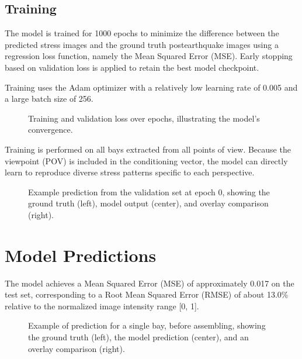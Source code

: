 \documentclass[letterpaper,10pt,english]{sphinxmanual}
\begin{document}
\section{Training}
\label{\detokenize{model:training}}
\sphinxAtStartPar
The model is trained for 1000 epochs to minimize the difference between the
predicted stress images and the ground truth post\sphinxhyphen{}earthquake images using a
regression loss function, namely the Mean Squared Error (MSE).
Early stopping based on validation loss is applied to retain the best model checkpoint.

\sphinxAtStartPar
Training uses the Adam optimizer with a relatively low learning rate of 0.005
and a large batch size of 256.

\begin{figure}[htbp]
\centering
\capstart

\noindent{}
\caption{Training and validation loss over epochs, illustrating the model’s convergence.}\label{\detokenize{model:id3}}\end{figure}

\sphinxAtStartPar
Training is performed on all bays extracted from all points of view.
Because the viewpoint (POV) is included in the conditioning vector, the model
can directly learn to reproduce diverse stress patterns specific to each
perspective.

\begin{figure}[htbp]
\centering
\capstart

\noindent{}
\caption{Example prediction from the validation set at epoch 0, showing the ground
truth (left), model output (center), and overlay comparison (right).}\label{\detokenize{model:id4}}\end{figure}

\sphinxstepscope


\chapter{Model Predictions}
\label{\detokenize{predictions:model-predictions}}\label{\detokenize{predictions:prediction-section}}\label{\detokenize{predictions::doc}}
\sphinxAtStartPar
The model achieves a Mean Squared Error (MSE) of approximately 0.017 on the
test set, corresponding to a Root Mean Squared Error (RMSE) of about 13.0\%
relative to the normalized image intensity range {[}0, 1{]}.

\begin{figure}[htbp]
\centering
\capstart

\noindent{}
\caption{Example of prediction for a single bay, before assembling, showing
the ground truth (left), the model prediction (center), and an overlay
comparison (right).}\label{\detokenize{predictions:id1}}\end{figure}
\end{document}

